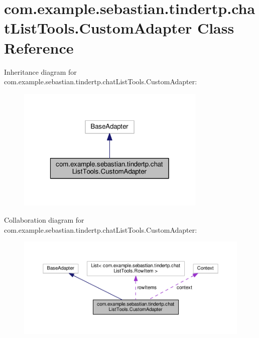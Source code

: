 \hypertarget{classcom_1_1example_1_1sebastian_1_1tindertp_1_1chatListTools_1_1CustomAdapter}{}\section{com.\+example.\+sebastian.\+tindertp.\+chat\+List\+Tools.\+Custom\+Adapter Class Reference}
\label{classcom_1_1example_1_1sebastian_1_1tindertp_1_1chatListTools_1_1CustomAdapter}


Inheritance diagram for com.\+example.\+sebastian.\+tindertp.\+chat\+List\+Tools.\+Custom\+Adapter\+:
\nopagebreak
\begin{figure}[H]
\begin{center}
\leavevmode
\includegraphics[width=256pt]{classcom_1_1example_1_1sebastian_1_1tindertp_1_1chatListTools_1_1CustomAdapter__inherit__graph}
\end{center}
\end{figure}


Collaboration diagram for com.\+example.\+sebastian.\+tindertp.\+chat\+List\+Tools.\+Custom\+Adapter\+:
\nopagebreak
\begin{figure}[H]
\begin{center}
\leavevmode
\includegraphics[width=350pt]{classcom_1_1example_1_1sebastian_1_1tindertp_1_1chatListTools_1_1CustomAdapter__coll__graph}
\end{center}
\end{figure}
